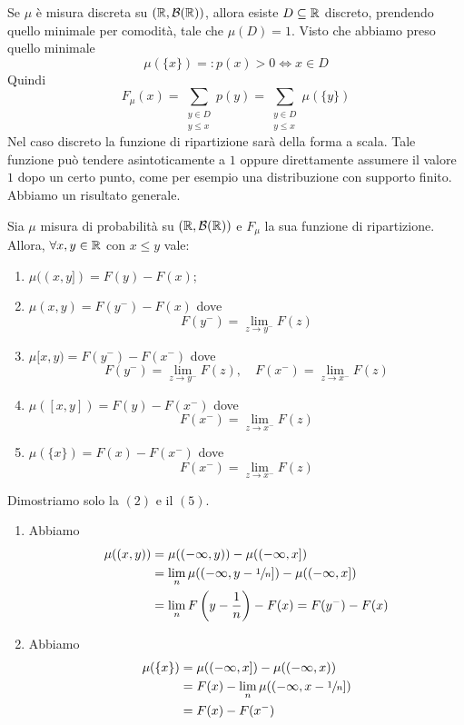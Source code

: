 \documentclass[a4paper]{article}
\begin{document}
Se \(\mu\) è misura discreta su \((\mathbb{R}, \mathcal B(\mathbb{R}))\),
allora esiste \(D \subseteq \mathbb{R}\) discreto, prendendo quello minimale
per comodità, tale che \(\mu(D) = 1\).
Visto che abbiamo preso quello minimale \[
    \mu(\{x\}) =: p(x) > 0 \iff x \in D
\]
Quindi
\[
    F_\mu(x) = \sum_{\substack{y \in D \\ y \leq x}} p(y)
    = \sum_{\substack{y \in D \\ y \leq x}}
    \mu(\{y\})
\]
Nel caso discreto la funzione di ripartizione sarà della forma a scala.
Tale funzione può tendere asintoticamente a \(1\) oppure direttamente assumere il valore
\(1\) dopo un certo punto, come per esempio una distribuzione con supporto finito.
Abbiamo un risultato generale.

\begin{snippetproposition}{}
    Sia \(\mu\) misura di probabilità su \((\mathbb{R}, \mathcal B(\mathbb{R}))\)
    e \(F_\mu\) la sua funzione di ripartizione. Allora,
    \(\forall x, y \in \mathbb{R}\) con \(x \leq y\) vale:
    \begin{enumerate}
        \item \(\mu((x,y]) = F(y) - F(x)\);
        \item \(\mu(x,y) = F(y^-) - F(x)\) dove \[
                F(y^-) = \lim_{z \to y^-} F(z)
            \]
        \item \(\mu[x,y) = F(y^-) - F(x^-)\) dove \[
                F(y^-) = \lim_{z \to y^-} F(z), \quad
                F(x^-) = \lim_{z \to x^-} F(z)
            \]
        \item \(\mu([x,y]) = F(y) - F(x^-)\) dove \[
                F(x^-) = \lim_{z \to x^-} F(z)
            \]
        \item \(\mu(\{x\}) = F(x) - F(x^-)\) dove \[
                F(x^-) = \lim_{z \to x^-} F(z)
            \]
    \end{enumerate}
\end{snippetproposition}

\begin{snippetproof}{}
    Dimostriamo solo la \((2)\) e il \((5)\).
    \begin{enumerate}
        \item Abbiamo
            \begin{align*}
                \mu((x,y)) &= \mu((-\infty, y))
                - \mu((-\infty, x]) \\
                &= \lim_n \mu((-\infty, y - \sfrac1n])
                - \mu((-\infty, x]) \\
                &= \lim_n F\left(y - \frac1n\right)
                - F(x) = F(y^-) - F(x)
            \end{align*}
        \item Abbiamo
            \begin{align*}
                \mu(\{x\}) &= \mu((-\infty, x]) - \mu((-\infty, x)) \\
                &= F(x) - \lim_n \mu((-\infty, x - \sfrac1n]) \\
                &= F(x) - F(x^-)
            \end{align*}
    \end{enumerate}
\end{snippetproof}
\end{document}
